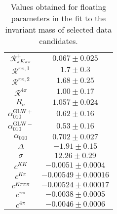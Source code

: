 \begin{table}
\begin{tabular}{cc}
$\mathcal{R}_{\pi K\pi\pi}^+$ & $0.067 \pm 0.025$ \\
$\mathcal{R}^{\pi\pi,1}$ & $1.7 \pm 0.3$ \\
$\mathcal{R}^{\pi\pi,2}$ & $1.68 \pm 0.25$ \\
$\mathcal{R}^{4\pi}$ & $1.00 \pm 0.17$ \\
$R_\sigma$ & $1.057 \pm 0.024$ \\
$\alpha_{010}^{\mathrm{GLW}+}$ & $0.62 \pm 0.16$ \\
$\alpha_{010}^{\mathrm{GLW}-}$ & $0.53 \pm 0.16$ \\
$\alpha_{010}$ & $0.702 \pm 0.027$ \\
$\Delta$ & $-1.91 \pm 0.15$ \\
$\sigma$ & $12.26 \pm 0.29$ \\
$c^{KK}$ & $-0.0051 \pm 0.0004$ \\
$c^{K\pi}$ & $-0.00549 \pm 0.00016$ \\
$c^{K\pi\pi\pi}$ & $-0.00524 \pm 0.00017$ \\
$c^{\pi\pi}$ & $-0.0038 \pm 0.0005$ \\
$c^{4\pi}$ & $-0.0046 \pm 0.0006$ \\
      \bottomrule
  \end{tabular}
  \caption{Values obtained for floating parameters in the fit to the invariant mass of selected data candidates.}
\label{tab:fit_result}
\end{table}
